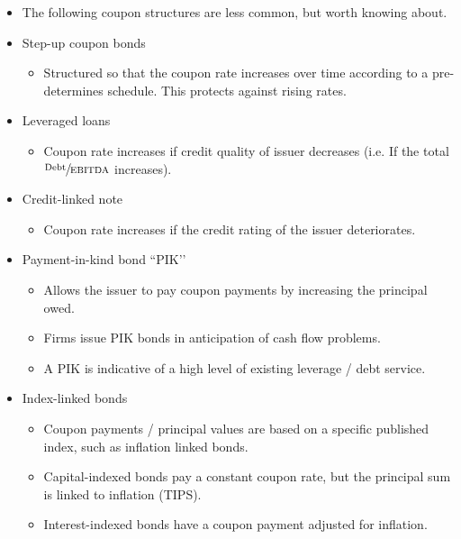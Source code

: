 \documentclass[../notes_compiled.tex]{subfiles}
\begin{document}
\begin{itemize}
\begin{itemize}
\item It is important to adjust the annual MRR / margin for quarterly payments as follows,
\begin{equation}
\text{Quarterly payment} = \frac{\text{MRR} + \text{Margin}}{4}.
\end{equation}
\end{itemize}
\item[] The following coupon structures are less common, but worth knowing about.
\item Step-up coupon bonds
\begin{itemize}
\item Structured so that the coupon rate increases over time according to a pre-determines schedule. This protects against rising rates.
\end{itemize}
\item Leveraged loans
\begin{itemize}
\item Coupon rate increases if credit quality of issuer decreases (i.e. If the total $\sfrac{\text{Debt}}{\text{EBITDA}}$ increases).
\end{itemize}
\item Credit-linked note
\begin{itemize}
\item Coupon rate increases if the credit rating of the issuer deteriorates.
\end{itemize}
\item Payment-in-kind bond ``PIK’’
\begin{itemize}
\item Allows the issuer to pay coupon payments by increasing the principal owed.
\item Firms issue PIK bonds in anticipation of cash flow problems.
\item A PIK is indicative of a high level of existing leverage / debt service.
\end{itemize}
\item Index-linked bonds
\begin{itemize}
\item Coupon payments / principal values are based on a specific published index, such as inflation linked bonds.
\item Capital-indexed bonds pay a constant coupon rate, but the principal sum is linked to inflation (TIPS).
\item Interest-indexed bonds have a coupon payment adjusted for inflation.
\end{itemize}

\end{itemize}
\end{document}
